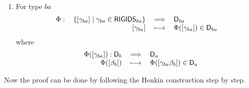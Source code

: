 \begin{enumerate}
\begin{enumerate}
\item For type $ba$ 
\begin{equation*}
\begin{tabular}{llll}
$\Phi :$ & $\left\{ \left[ \gamma _{ba}\right] \mid \gamma _{ba}\in \mathsf{%
RIGIDS}_{ba}\right\} $ & $\Longrightarrow $ & $\mathsf{D}_{ba}$ \\ 
& \multicolumn{1}{r}{$\left[ \gamma _{ba}\right] $} & $\longmapsto $ & $\Phi
(\left[ \gamma _{ba}\right] )\in \mathsf{D}_{ba}$%
\end{tabular}%
\end{equation*}%
where%
\begin{equation*}
\begin{tabular}{lrll}
& $\Phi (\left[ \gamma _{ba}\right] ):\mathsf{D}_{b}$ & $\Longrightarrow $ & 
$\mathsf{D}_{a}$ \\ 
& $\Phi (\left[ \beta _{b}\right] )$ & $\longmapsto $ & $\Phi (\left[ \gamma
_{ba}\beta _{b}\right] )\in \mathsf{D}_{a}$%
\end{tabular}%
\end{equation*}
\end{enumerate}
\end{enumerate}

Now the proof can be done by following the Henkin construction step by step.


